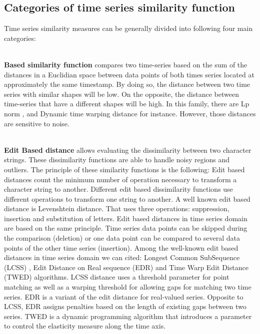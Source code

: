 \subsection{Categories of time series similarity function}


Time series similarity measures can be generally divided into following four main categories:

\\

\textbf{Based similarity function} compares two time-series based on the sum of the distances in a Euclidian space between data points of both times series located at approximately the same timestamp. By doing so, the distance between two time series with similar shapes will be low. On the opposite, the distance between time-series that have a different shapes will be high. In this family, there are Lp norm \cite{yi2000fast} \cite{keogh2003need}, and Dynamic time warping distance \cite{ MyersRabinerRosenberg1980} for instance. However, those distances are sensitive to noise.

\\

\textbf{Edit Based distance} allows evaluating the dissimilarity between two character strings. These dissimilarity functions are able to handle noisy regions and outliers. The principle of these similarity functions is the following: Edit based distances count the minimum number of operation necessary to transform a character string to another. Different edit based dissimilarity functions use different operations to transform one string to another. A well known edit based distance is Levenshtein distance. That uses three operations: suppression, insertion and substitution of letters. Edit based distances in time series domain are based on the same principle. Time series data points can be skipped during the comparison (deletion) or one  data point can be compared to several data points of the other time series (insertion). Among the well-known  edit based distances in time series domain we can cited: Longest Common SubSequence (LCSS) \cite{das1997finding}, Edit Distance on Real sequence (EDR) \cite{chen2005robust} and Time Warp Edit Distance (TWED) \cite{marteau2009time} algorithms. LCSS distance uses a threshold parameter for point matching as well as a warping threshold for allowing gaps for matching two time series. EDR is a variant of the edit distance for real-valued series. Opposite to LCSS, EDR assigns penalties based on the length of existing gaps between two series. TWED is a dynamic programming algorithm that introduces a parameter to control the elasticity measure along the time axis. 

